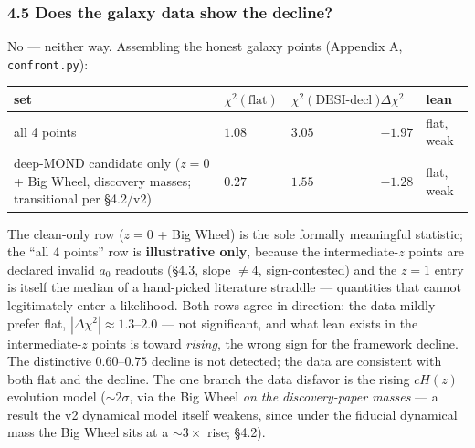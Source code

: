 \documentclass[
]{article}
\newcounter{none} %
\begin{document}
\subsubsection{4.5 Does the galaxy data show the
decline?}\label{does-the-galaxy-data-show-the-decline}

No --- neither way. Assembling the honest galaxy points (Appendix A,
\texttt{confront.py}):

{\def\LTcaptype{none} %
\begin{longtable}[]{@{}
  >{\raggedright\arraybackslash}p{}
  >{\raggedright\arraybackslash}p{}
  >{\raggedright\arraybackslash}p{}
  >{\raggedright\arraybackslash}p{}
  >{\raggedright\arraybackslash}p{}@{}}
\toprule\noalign{}
\begin{minipage}[b]{\linewidth}\raggedright
set
\end{minipage} & \begin{minipage}[b]{\linewidth}\raggedright
\(\chi^2(\text{flat})\)
\end{minipage} & \begin{minipage}[b]{\linewidth}\raggedright
\(\chi^2(\text{DESI-decl})\)
\end{minipage} & \begin{minipage}[b]{\linewidth}\raggedright
\(\Delta\chi^2\)
\end{minipage} & \begin{minipage}[b]{\linewidth}\raggedright
lean
\end{minipage} \\
\midrule\noalign{}
\endhead
\bottomrule\noalign{}
\endlastfoot
all 4 points & \(1.08\) & \(3.05\) & \(-1.97\) & flat, weak \\
deep-MOND candidate only (\(z=0\) + Big Wheel, discovery masses;
transitional per §4.2/v2) & \(0.27\) & \(1.55\) & \(-1.28\) & flat,
weak \\
\end{longtable}
}

The clean-only row (\(z=0\) + Big Wheel) is the sole formally meaningful
statistic; the ``all 4 points'' row is \textbf{illustrative only},
because the intermediate-\(z\) points are declared invalid \(a_0\)
readouts (§4.3, slope \(\ne4\), sign-contested) and the \(z=1\) entry is
itself the median of a hand-picked literature straddle --- quantities
that cannot legitimately enter a likelihood. Both rows agree in
direction: the data mildly prefer flat,
\(|\Delta\chi^2|\approx1.3\)--\(2.0\) --- not significant, and what lean
exists in the intermediate-\(z\) points is toward \emph{rising}, the
wrong sign for the framework decline. The distinctive \(0.60\)--\(0.75\)
decline is not detected; the data are consistent with both flat and the
decline. The one branch the data disfavor is the rising \(cH(z)\)
evolution model (\(\sim2\sigma\), via the Big Wheel \emph{on the
discovery-paper masses} --- a result the v2 dynamical model itself
weakens, since under the fiducial dynamical mass the Big Wheel sits at a
\(\sim3\times\) rise; §4.2).
\end{document}
